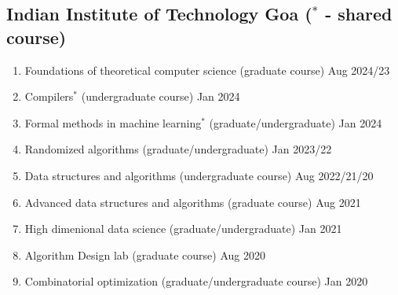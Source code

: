 \documentclass[11pt,a4paper,sans]{moderncv} %
\begin{document}
					\subsection{ Indian Institute of Technology Goa  ($^*$ - shared course)}
					\begin{enumerate}
					\item {Foundations of theoretical computer science}  (graduate course) \hfill Aug 2024/23
					\item {Compilers$^*$} (undergraduate course) \hfill Jan 2024
					\item {Formal methods in machine learning$^*$} (graduate/undergraduate) \hfill Jan 2024
					\item Randomized algorithms (graduate/undergraduate) \hfill Jan 2023/22
					\item {Data structures and algorithms} (undergraduate course)  \hfill  Aug 2022/21/20
					\item {Advanced data structures and algorithms}  (graduate course)  \hfill Aug 2021
					\item {High dimenional data science} (graduate/undergraduate) \hfill Jan 2021
					\item {Algorithm Design lab} (graduate course) \hfill  Aug 2020
					\item {Combinatorial optimization} (graduate/undergraduate course) \hfill  Jan 2020

\end{enumerate}
\end{document}
